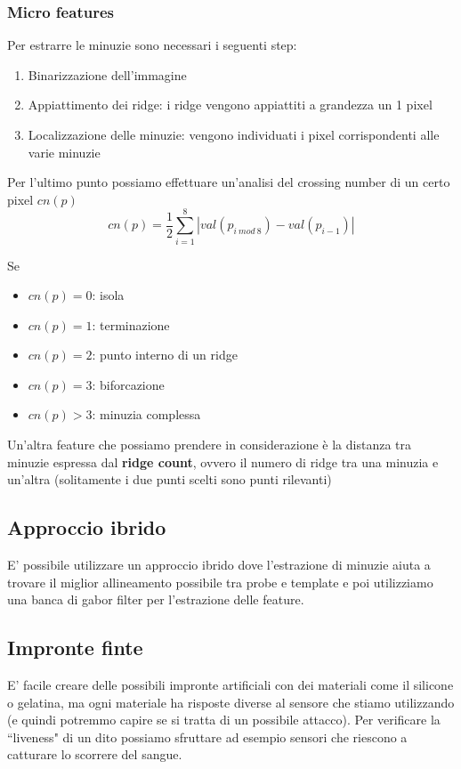 \documentclass{article}
\begin{document}
\subsubsection{Micro features}
Per estrarre le minuzie sono necessari i seguenti step:
\begin{enumerate}
    \item Binarizzazione dell'immagine
    \item Appiattimento dei ridge: i ridge vengono appiattiti a grandezza un 1 pixel
    \item Localizzazione delle minuzie: vengono individuati i pixel corrispondenti alle varie minuzie
\end{enumerate}

Per l'ultimo punto possiamo effettuare un'analisi del crossing number di un certo pixel $cn(p)$
$$cn(p) = \frac{1}{2} \sum_{i=1}^8 | val(p_{i\ mod\ 8}) - val(p_{i-1}) |$$

Se
\begin{itemize}
    \item $cn(p) = 0$: isola
    \item $cn(p) = 1$: terminazione
    \item $cn(p) = 2$: punto interno di un ridge
    \item $cn(p) = 3$: biforcazione
    \item $cn(p) > 3$: minuzia complessa
\end{itemize}

Un'altra feature che possiamo prendere in considerazione è la distanza tra minuzie espressa dal \textbf{ridge count}, ovvero il numero di ridge tra una minuzia e un'altra (solitamente i due punti scelti sono punti rilevanti)

\subsection{Approccio ibrido}
E' possibile utilizzare un approccio ibrido dove l'estrazione di minuzie aiuta a trovare il miglior allineamento possibile tra probe e template e poi utilizziamo una banca di gabor filter per l'estrazione delle feature. 

\subsection{Impronte finte}
E' facile creare delle possibili impronte artificiali con dei materiali come il silicone o gelatina, ma ogni materiale ha risposte diverse al sensore che stiamo utilizzando (e quindi potremmo capire se si tratta di un possibile attacco).
Per verificare la ``liveness" di un dito possiamo sfruttare ad esempio sensori che riescono a catturare lo scorrere del sangue.
\end{document}
